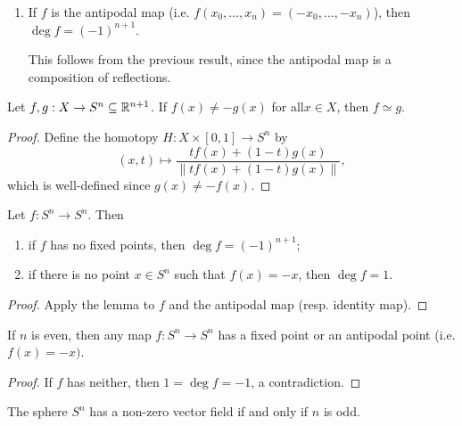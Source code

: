 \begin{remark}
\begin{enumerate}
      This completes the proof by induction since
      we already know the result for $\partial D^n_- \cong S^{n - 1}$.
    \item If $f$ is the antipodal map (i.e.
      $f(x_0, \dots, x_n) = (-x_0, \dots, -x_n)$), then $\deg f = (-1)^{n + 1}$.

      This follows from the previous result, since the
      antipodal map is a composition of reflections.
  \end{enumerate}
\end{remark}

\begin{lemma}
  Let $f, g : X \to S^n \subseteq \mathbb{R}^{n + 1}$.
  If $f(x) \ne -g(x)$ for all$ x \in X$, then $f \simeq g$.
\end{lemma}

\begin{proof}
  Define the homotopy $H : X \times [0, 1] \to S^n$ by
  \[
    (x, t) \longmapsto \frac{t f(x) + (1 - t) g(x)}{\|t f(x) + (1 - t) g(x)\|},
  \]
  which is well-defined since $g(x) \ne -f(x)$.
\end{proof}

\begin{corollary}
  Let $f : S^n \to S^n$. Then
  \begin{enumerate}
    \item if $f$ has no fixed points, then $\deg f = (-1)^{n + 1}$;
    \item if there is no point $x \in S^n$ such that
      $f(x) = -x$, then $\deg f = 1$.
  \end{enumerate}
\end{corollary}

\begin{proof}
  Apply the lemma to $f$ and the antipodal map
  (resp. identity map).
\end{proof}

\begin{corollary}
  If $n$ is even, then any map $f : S^n \to S^n$
  has a fixed point or an antipodal point
  (i.e. $f(x) = -x)$.
\end{corollary}

\begin{proof}
  If $f$ has neither, then $1 = \deg f = -1$, a
  contradiction.
\end{proof}

\begin{corollary}
  The sphere $S^n$ has a non-zero vector field if
  and only if $n$ is odd.
\end{corollary}

